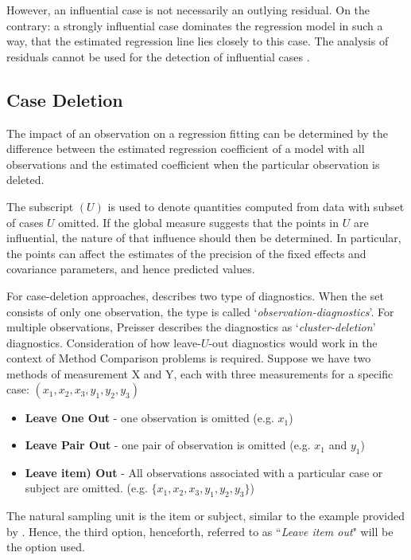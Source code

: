 \documentclass[12pt, a4paper]{report}
\theoremstyle{definition}
\theoremstyle{remark}
\begin{document}
However, an influential case is not necessarily an outlying residual. On the contrary: a strongly influential case dominates
the regression model in such a way, that the estimated regression line lies closely to this case. The analysis of residuals cannot be used for the detection of influential cases \citep{crawley2012r}.

\subsection*{Case Deletion}

The impact of an observation on a regression fitting can be determined by the difference between the estimated regression coefficient of a model with all observations and the estimated coefficient when the particular observation is deleted. 

The subscript $(U)$ is used to denote quantities computed from data with subset of cases $U$ omitted.
If the global measure suggests that the points in $U$ are influential, the nature of
that influence should then be determined. In particular, the points can affect the estimates of the precision of the fixed effects and covariance parameters, and hence predicted values.


For case-deletion approaches, \citet{preisser} describes two type of diagnostics. When the set consists of only one observation, the type is called
`\textit{observation-diagnostics}'. For multiple observations, Preisser describes the diagnostics as `\textit{cluster-deletion}' diagnostics. Consideration of how leave-$U$-out diagnostics would work in the context of Method Comparison problems is required.  Suppose we have two methods of measurement X and Y, each with three measurements for a specific case: $(x_1,x_2,x_3,y_1,y_2,y_3)$

\begin{itemize}
\item \textbf{Leave One Out} - one observation is omitted (e.g. $x_1$)
\item \textbf{Leave Pair Out} - one pair of observation  is omitted (e.g. $x_1$ and $y_1$)
\item \textbf{Leave item) Out} - All observations associated with a particular case or subject are omitted. (e.g. $\{x_1,x_2,x_3,y_1,y_2,y_3\}$)
\end{itemize}

The natural sampling unit is the item or subject, similar to the example provided by \citet{schabenberger}. Hence, the third option, henceforth, referred to as ``\textit{Leave item out}" will be the option used.
\end{document}
